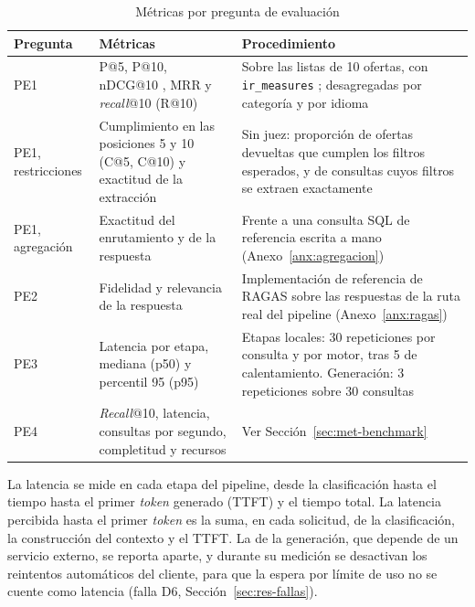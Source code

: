 \begin{table}[htbp!]
    \centering
    \caption{Métricas por pregunta de evaluación}
    \label{tab:met-metricas}
    \small
    \begin{tabular}{|p{1.9cm}|p{5.3cm}|p{6.9cm}|}
        \hline
        \textbf{Pregunta} & \textbf{Métricas} & \textbf{Procedimiento} \\
        \hline
        PE1 & P@5, P@10, nDCG@10 \citep{Jarvelin2002}, MRR y \textit{recall}@10 (R@10) & Sobre las listas de 10 ofertas, con \texttt{ir\_measures} \citep{MacAvaney2022}; desagregadas por categoría y por idioma \\
        \hline
        PE1, restricciones & Cumplimiento en las posiciones 5 y 10 (C@5, C@10) y exactitud de la extracción & Sin juez: proporción de ofertas devueltas que cumplen los filtros esperados, y de consultas cuyos filtros se extraen exactamente \\
        \hline
        PE1, agregación & Exactitud del enrutamiento y de la respuesta & Frente a una consulta SQL de referencia escrita a mano (Anexo~\ref{anx:agregacion}) \\
        \hline
        PE2 & Fidelidad y relevancia de la respuesta \citep{Es2024} & Implementación de referencia de RAGAS sobre las respuestas de la ruta real del pipeline (Anexo~\ref{anx:ragas}) \\
        \hline
        PE3 & Latencia por etapa, mediana (p50) y percentil 95 (p95) & Etapas locales: 30 repeticiones por consulta y por motor, tras 5 de calentamiento. Generación: 3 repeticiones sobre 30 consultas \\
        \hline
        PE4 & \textit{Recall}@10, latencia, consultas por segundo, completitud y recursos & Ver Sección~\ref{sec:met-benchmark} \\
        \hline
    \end{tabular}
\end{table}

La latencia se mide en cada etapa del pipeline, desde la clasificación hasta el tiempo hasta el primer \textit{token} generado (TTFT) y el tiempo total. La latencia percibida hasta el primer \textit{token} es la suma, en cada solicitud, de la clasificación, la construcción del contexto y el TTFT. La de la generación, que depende de un servicio externo, se reporta aparte, y durante su medición se desactivan los reintentos automáticos del cliente, para que la espera por límite de uso no se cuente como latencia (falla D6, Sección~\ref{sec:res-fallas}).

